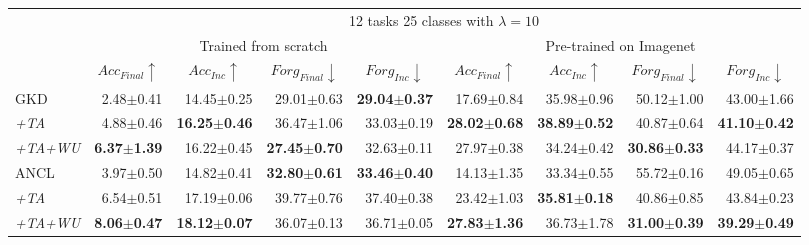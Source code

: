 \begin{appendix}
\begin{table*}[t]
{\begin{tabular}{@{}lrrrrrrrr@{}}
  \midrule
  & \multicolumn{8}{c}{12 tasks 25 classes with $\lambda = 10$}
  \\ \cmidrule{2-9}
  &
  \multicolumn{4}{c}{Trained from scratch} &
  \multicolumn{4}{c}{Pre-trained on Imagenet}
  \\ \cmidrule{2-9}
  &
  \multicolumn{1}{c}{$Acc_{Final} \uparrow$} &
  \multicolumn{1}{c}{$Acc_{Inc} \uparrow$} &
  \multicolumn{1}{c}{$Forg_{Final} \downarrow$} &
  \multicolumn{1}{c}{$Forg_{Inc} \downarrow$} &
  \multicolumn{1}{c}{$Acc_{Final} \uparrow$} &
  \multicolumn{1}{c}{$Acc_{Inc} \uparrow$} &
  \multicolumn{1}{c}{$Forg_{Final} \downarrow$} &
  \multicolumn{1}{c}{$Forg_{Inc} \downarrow$} \\ \cmidrule{2-9}
  GKD &
  2.48$\pm$0.41 &
  14.45$\pm$0.25 &
  29.01$\pm$0.63 &
  \textbf{29.04$\pm$0.37} &
  17.69$\pm$0.84 &
  35.98$\pm$0.96 &
  50.12$\pm$1.00 &
  43.00$\pm$1.66 \\
\textit{+TA} &
  4.88$\pm$0.46 &
  \textbf{16.25$\pm$0.46} &
  36.47$\pm$1.06 &
  33.03$\pm$0.19 &
  \textbf{28.02$\pm$0.68} &
  \textbf{38.89$\pm$0.52} &
  40.87$\pm$0.64 &
  \textbf{41.10$\pm$0.42} \\
\textit{+TA+WU} &
  \textbf{6.37$\pm$1.39} &
  16.22$\pm$0.45 &
  \textbf{27.45$\pm$0.70} &
  32.63$\pm$0.11 &
  27.97$\pm$0.38 &
  34.24$\pm$0.42 &
  \textbf{30.86$\pm$0.33} &
  44.17$\pm$0.37
 \\ \midrule
 ANCL &
  3.97$\pm$0.50  & 14.82$\pm$0.41 & \textbf{32.80$\pm$0.61} & \textbf{33.46$\pm$0.40} & 14.13$\pm$1.35 & 33.34$\pm$0.55 & 55.72$\pm$0.16 & 49.05$\pm$0.65 \\
\textit{+TA} &
  6.54$\pm$0.51  & 17.19$\pm$0.06 & 39.77$\pm$0.76 & 37.40$\pm$0.38 & 23.42$\pm$1.03 & \textbf{35.81$\pm$0.18} & 40.86$\pm$0.85 & 43.84$\pm$0.23 \\
\textit{+TA+WU} &
  \textbf{8.06$\pm$0.47} & \textbf{18.12$\pm$0.07} & 36.07$\pm$0.13 & 36.71$\pm$0.05 & \textbf{27.83$\pm$1.36} & 36.73$\pm$1.78 & \textbf{31.00$\pm$0.39} & \textbf{39.29$\pm$0.49} \\
  
 \midrule
 

\end{tabular}}
\end{table*}
\end{appendix}
